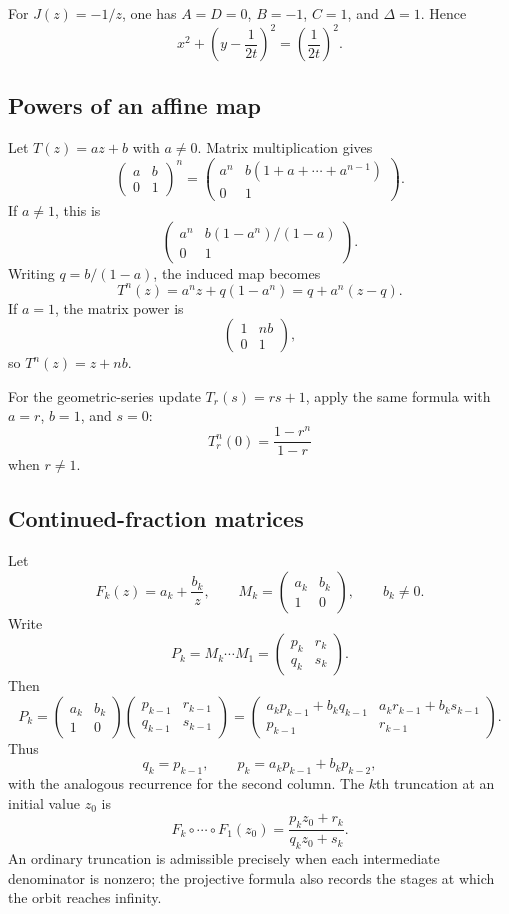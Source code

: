 For $J(z)=-1/z$, one has $A=D=0$, $B=-1$, $C=1$, and
$\Delta=1$.  Hence
\[
  x^2+\left(y-\frac1{2t}\right)^2=\left(\frac1{2t}\right)^2.
\]

\subsection{Powers of an affine map}

Let $T(z)=az+b$ with $a\ne0$.  Matrix multiplication gives
\[
  \begin{pmatrix}a&b\\0&1\end{pmatrix}^n
  =\begin{pmatrix}
     a^n&b(1+a+\cdots+a^{n-1})\\
     0&1
   \end{pmatrix}.
\]
If $a\ne1$, this is
\[
  \begin{pmatrix}
     a^n&b(1-a^n)/(1-a)\\
     0&1
   \end{pmatrix}.
\]
Writing $q=b/(1-a)$, the induced map becomes
\[
  T^n(z)=a^nz+q(1-a^n)=q+a^n(z-q).
\]
If $a=1$, the matrix power is
\[
  \begin{pmatrix}1&nb\\0&1\end{pmatrix},
\]
so $T^n(z)=z+nb$.

For the geometric-series update $T_r(s)=rs+1$, apply the same formula with
$a=r$, $b=1$, and $s=0$:
\[
  T_r^n(0)=\frac{1-r^n}{1-r}
\]
when $r\ne1$.

\subsection{Continued-fraction matrices}

Let
\[
  F_k(z)=a_k+\frac{b_k}{z},
  \qquad
  M_k=\begin{pmatrix}a_k&b_k\\1&0\end{pmatrix},
  \qquad b_k\ne0.
\]
Write
\[
  P_k=M_k\cdots M_1
     =\begin{pmatrix}p_k&r_k\\q_k&s_k\end{pmatrix}.
\]
Then
\[
  P_k
  =\begin{pmatrix}a_k&b_k\\1&0\end{pmatrix}
   \begin{pmatrix}p_{k-1}&r_{k-1}\\q_{k-1}&s_{k-1}\end{pmatrix}
  =\begin{pmatrix}
      a_kp_{k-1}+b_kq_{k-1}&a_kr_{k-1}+b_ks_{k-1}\\
      p_{k-1}&r_{k-1}
    \end{pmatrix}.
\]
Thus
\[
  q_k=p_{k-1},
  \qquad
  p_k=a_kp_{k-1}+b_kp_{k-2},
\]
with the analogous recurrence for the second column.  The $k$th truncation at
an initial value $z_0$ is
\[
  F_k\circ\cdots\circ F_1(z_0)
  =\frac{p_kz_0+r_k}{q_kz_0+s_k}.
\]
An ordinary truncation is admissible precisely when each intermediate
denominator is nonzero; the projective formula also records the stages at
which the orbit reaches infinity.

